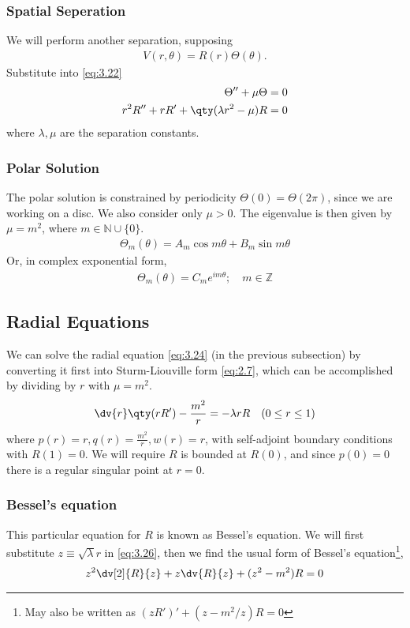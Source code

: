 \subsubsection{Spatial Seperation}
We will perform another separation, supposing
\begin{align*}
	V(r,\theta) = R(r) \Theta(\theta).
\end{align*}
Substitute into \cref{eq:3.22}
\begin{align}
	\Theta'' + \mu \Theta &= 0 \label{eq:3.23} \\
	r^2 R'' + r R' + \qty(\lambda r^2 - \mu) R &= 0 \label{eq:3.24}
\end{align}
where $\lambda, \mu$ are the separation constants.
\subsubsection{Polar Solution}
The polar solution is constrained by periodicity $\Theta(0) = \Theta(2 \pi)$, since we are working on a disc.
We also consider only $\mu > 0$.
The eigenvalue is then given by $\mu = m^2$, where $m \in \mathbb N \cup \{0\}$.
\begin{align} \label{eq:3.25}
	\Theta_m(\theta) = A_m \cos m \theta + B_m \sin m \theta
\end{align}
Or, in complex exponential form,
\begin{align*}
	\Theta_m(\theta) = C_m e^{im\theta};\quad m \in \mathbb Z
\end{align*}

\subsection{Radial Equations}
We can solve the radial equation \cref{eq:3.24} (in the previous subsection) by converting it first into Sturm-Liouville form \cref{eq:2.7}, which can be accomplished by dividing by $r$ with $\mu = m^2$.
\begin{align} \label{eq:3.26}
	\dv{r} \qty(r R') - \frac{m^2}{r} = -\lambda r R \quad (0 \leq r \leq 1)
\end{align}
where $p(r) = r, q(r) = \frac{m^2}{r}, w(r) = r$, with self-adjoint boundary conditions with $R(1) = 0$.
We will require $R$ is bounded at $R(0)$, and since $p(0) = 0$ there is a regular singular point at $r = 0$.

\subsubsection{Bessel's equation}
This particular equation for $R$ is known as Bessel's equation.
We will first substitute $z \equiv \sqrt{\lambda} r$ in \cref{eq:3.26}, then we find the usual form of Bessel's equation\footnote{May also be written as $(z R')' + (z - m^2 / z) R = 0$},
\begin{align} \label{eq:3.27}
	z^2 \dv[2]{R}{z} + z \dv{R}{z} + (z^2 - m^2)R = 0
\end{align}


